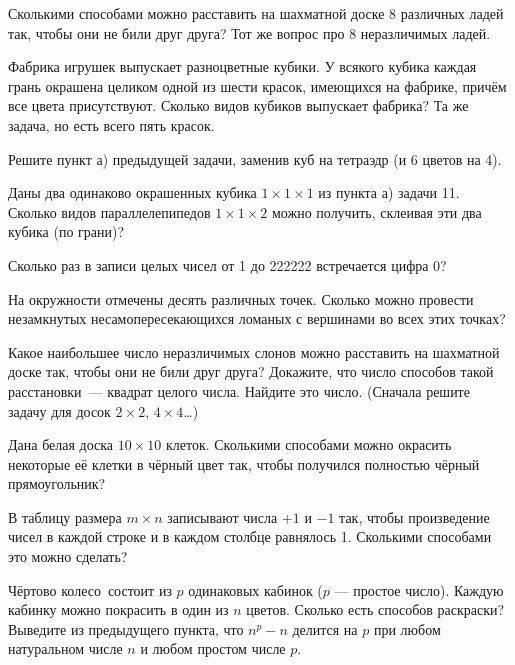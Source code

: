 \documentclass[12pt,a4paper]{article}
\begin{document}
 Сколькими способами можно расставить на шахматной
доске 8 различных ладей так, чтобы они не били друг друга?
Тот же вопрос про 8 неразличимых ладей.


Фабрика игрушек выпускает разноцветные кубики. У всякого
кубика каждая грань окрашена целиком одной из шести красок,
имеющихся на фабрике, причём все цвета присутствуют.
Сколько видов кубиков выпускает фабрика?
Та же задача, но есть всего пять красок.

 Решите пункт а) предыдущей задачи, заменив куб на тетраэдр
(и 6 цветов на 4).


 Даны два одинаково окрашенных кубика $1\times1\times1$
из пункта а) задачи 11. Сколько видов параллелепипедов %
$1\times1\times2$
можно получить, склеивая эти два кубика (по грани)?


Сколько раз в записи целых чисел от 1 до 222222 встречается цифра 0?

На окружности отмечены десять различных точек. Сколько можно провести
незамкнутых несамопересекающихся ломаных с вершинами во всех этих точках?


 Какое наибольшее число неразличимых слонов можно
расставить на шахматной доске так, чтобы они не били друг друга?
 Докажите, что число способов такой расстановки~--- квадрат
целого числа.
 Найдите это число. (Сначала решите
задачу для досок $2\times2$, $4\times4$\ldots)

Дана белая доска $10\times 10$ клеток. Сколькими
способами можно окрасить некоторые её клетки в чёрный цвет
так, чтобы получился полностью чёрный прямоугольник?

В таблицу размера $m\times n$ записывают числа
$+1$ и $-1$ так, чтобы произведение чисел в каждой строке и в каждом
столбце равнялось 1. Сколькими способами это можно сделать?

  Ч\"ертово колесо \ состоит из $p$ одинаковых кабинок
($p$ --- простое число). Каждую кабинку можно покрасить в один
из $n$ цветов. Сколько есть способов раскраски?\\
Выведите из предыдущего пункта, что $n^p-n$ делится на $p$ при любом
натуральном числе $n$ и любом простом числе $p$.




\end{document}
